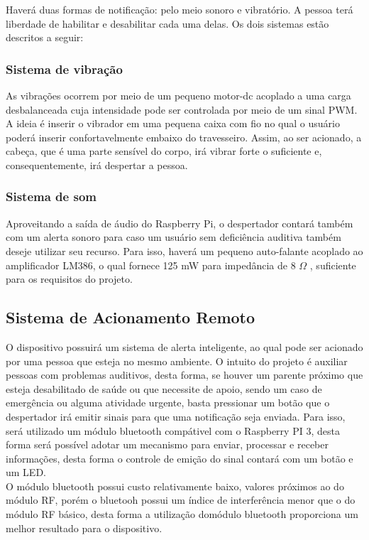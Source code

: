 \documentclass[conference]{IEEEtran}
\begin{document}
Haverá duas formas de notificação: pelo meio sonoro e vibratório. A pessoa terá liberdade de habilitar e desabilitar cada uma delas. Os dois sistemas estão descritos a seguir:

\subsubsection{\textbf{Sistema de vibração}}
As vibrações ocorrem por meio de um pequeno motor-dc acoplado a uma carga desbalanceada cuja intensidade pode ser controlada por meio de um sinal PWM. A ideia é inserir o vibrador em uma pequena caixa com fio no qual o usuário poderá inserir confortavelmente embaixo do travesseiro. Assim, ao ser acionado, a cabeça, que é uma parte sensível do corpo, irá vibrar forte o suficiente e, consequentemente, irá despertar a pessoa.

\subsubsection{\textbf{Sistema de som}}
Aproveitando a saída de áudio do Raspberry Pi, o despertador contará também com um alerta sonoro para caso um usuário sem deficiência auditiva também deseje utilizar seu recurso. Para isso, haverá um pequeno auto-falante acoplado ao amplificador LM386, o qual fornece 125 mW para impedância de 8 $\Omega$ \cite{mq2}, suficiente para os requisitos do projeto.

\subsection{\textbf{Sistema de Acionamento Remoto}}

O dispositivo possuirá um sistema de alerta inteligente, ao qual pode ser acionado por uma pessoa que esteja no mesmo ambiente. O intuito do projeto é auxiliar pessoas com problemas auditivos, desta forma, se houver um parente próximo que esteja desabilitado de saúde ou que necessite de apoio, sendo um caso de emergência ou alguma atividade urgente, basta pressionar um botão que o despertador irá emitir sinais para que uma notificação seja enviada. Para isso, será utilizado um módulo bluetooth compátivel com o Raspberry PI 3, desta forma será possível adotar um mecanismo para enviar, processar e receber informações, desta forma o controle de emição do sinal contará com um botão e um LED.
\\
O módulo bluetooth possui custo relativamente baixo, valores próximos ao do módulo RF, porém o bluetooh possui um índice de interferência menor que o do módulo RF básico, desta forma a utilização domódulo bluetooth proporciona um melhor resultado para o dispositivo.
\end{document}
